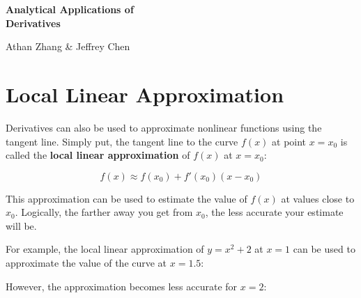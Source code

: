 \documentclass[11pt]{article}
\begin{document}
\textbf{\Huge Analytical Applications of \\ Derivatives}

Athan Zhang \& Jeffrey Chen

\section{Local Linear Approximation}
Derivatives can also be used to approximate nonlinear functions using the tangent line. Simply put, the tangent line to the curve $f(x)$ at point $x=x_0$ is called the \textbf{local linear approximation} of $f(x)$ at $x=x_0$: 

\[f(x) \approx f(x_0)+f'(x_0)(x-x_0)\]

This approximation can be used to estimate the value of $f(x)$ at values close to $x_0$. Logically, the farther away you get from $x_0$, the less accurate your estimate will be. 

For example, the local linear approximation of $y=x^2+2$ at $x=1$ can be used to approximate the value of the curve at $x=1.5$:

\begin{center}
\end{center}

However, the approximation becomes less accurate for $x=2$:
\end{document}
